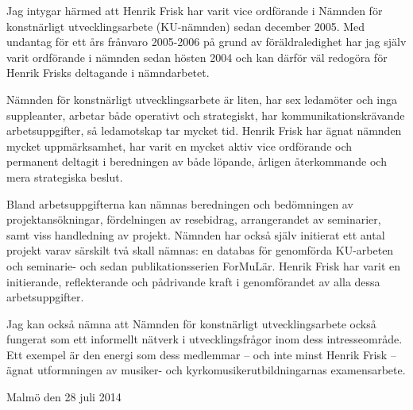 \documentclass[mhm,color]{luletter}
\begin{document}
\diarynumber{}
\renewcommand{\today}{28 juli 2014}
\signature{Hans Hellsten}
\telephone{}
\email{}
\homepage{}

\begin{letter}{}

\opening{}
\small
\sloppy
Jag intygar härmed att Henrik Frisk har varit vice ordförande i Nämnden för konstnärligt utvecklingsarbete (KU-nämnden) sedan december 2005. Med undantag för ett års frånvaro 2005-2006 på grund av föräldraledighet har jag själv varit ordförande i nämnden sedan hösten 2004 och kan därför väl redogöra för Henrik Frisks deltagande i nämndarbetet.

Nämnden för konstnärligt utvecklingsarbete är liten, har sex ledamöter och inga suppleanter, arbetar både operativt och strategiskt, har kommunikationskrävande arbetsuppgifter, så ledamotskap tar mycket tid. Henrik Frisk har ägnat nämnden mycket uppmärksamhet, har varit en mycket aktiv vice ordförande och permanent deltagit i beredningen av både löpande, årligen återkommande och mera strategiska beslut. 

Bland arbetsuppgifterna kan nämnas beredningen och bedömningen av projektansökningar, fördelningen av resebidrag, arrangerandet av seminarier, samt viss handledning av projekt. Nämnden har också själv initierat ett antal projekt varav särskilt två skall nämnas: en databas för genomförda KU-arbeten och seminarie- och sedan publikationsserien ForMuLär. Henrik Frisk har varit en initierande, reflekterande och pådrivande kraft i genomförandet av alla dessa arbetsuppgifter.

Jag kan också nämna att Nämnden för konstnärligt utvecklingsarbete också fungerat som ett informellt nätverk i utvecklingsfrågor inom dess intresseområde. Ett exempel är den energi som dess medlemmar – och inte minst Henrik Frisk – ägnat utformningen av musiker- och kyrkomusikerutbildningarnas examensarbete.


\closing{Malmö den 28 juli 2014}

\end{letter}
\end{document}
